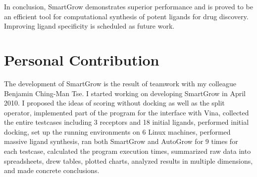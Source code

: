In conclusion, SmartGrow demonstrates superior performance and is proved to be an efficient tool for computational synthesis of potent ligands for drug discovery. Improving ligand specificity \citep{473-2010} is scheduled as future work.

\section{Personal Contribution}

The development of SmartGrow is the result of teamwork with my colleague Benjamin Ching-Man Tse. I started working on developing SmartGrow in April 2010. I proposed the ideas of scoring without docking as well as the split operator, implemented part of the program for the interface with Vina, collected the entire testcases including 3 receptors and 18 initial ligands, performed initial docking, set up the running environments on 6 Linux machines, performed massive ligand synthesis, ran both SmartGrow and AutoGrow for 9 times for each testcase, calculated the program execution times, summarized raw data into spreadsheets, drew tables, plotted charts, analyzed results in multiple dimensions, and made concrete conclusions.

\chapterend
